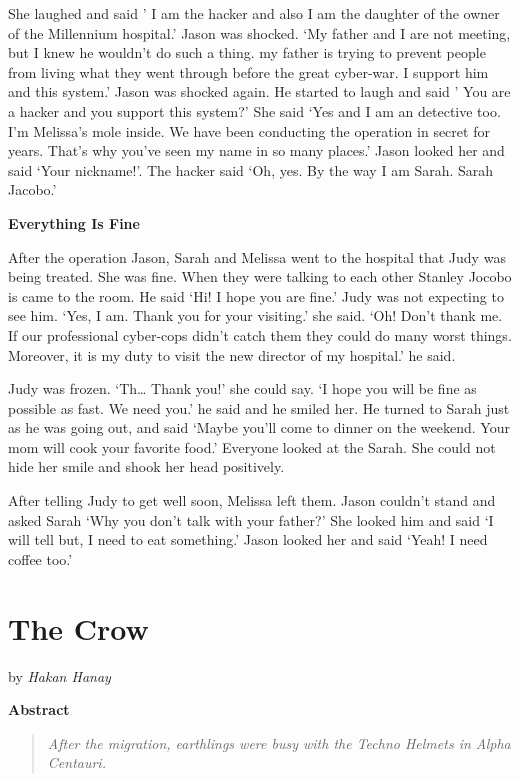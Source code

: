 \documentclass[]{book}
\begin{document}
She laughed and said ' I am the hacker and also I am the daughter of the owner of the Millennium hospital.' Jason was shocked. `My father and I are not meeting, but I knew he wouldn't do such a thing. my father is trying to prevent people from living what they went through before the great cyber-war. I support him and this system.' Jason was shocked again. He started to laugh and said ' You are a hacker and you support this system?' She said `Yes and I am an detective too. I'm Melissa's mole inside. We have been conducting the operation in secret for years. That's why you've seen my name in so many places.' Jason looked her and said `Your nickname!'. The hacker said `Oh, yes. By the way I am Sarah. Sarah Jacobo.'

\textbf{Everything Is Fine}

After the operation Jason, Sarah and Melissa went to the hospital that Judy was being treated. She was fine. When they were talking to each other Stanley Jocobo is came to the room. He said `Hi! I hope you are fine.' Judy was not expecting to see him. `Yes, I am. Thank you for your visiting.' she said. `Oh! Don't thank me. If our professional cyber-cops didn't catch them they could do many worst things. Moreover, it is my duty to visit the new director of my hospital.' he said.

Judy was frozen. `Th\ldots{} Thank you!' she could say. `I hope you will be fine as possible as fast. We need you.' he said and he smiled her. He turned to Sarah just as he was going out, and said `Maybe you'll come to dinner on the weekend. Your mom will cook your favorite food.' Everyone looked at the Sarah. She could not hide her smile and shook her head positively.

After telling Judy to get well soon, Melissa left them. Jason couldn't stand and asked Sarah `Why you don't talk with your father?' She looked him and said `I will tell but, I need to eat something.' Jason looked her and said `Yeah! I need coffee too.'

\hypertarget{the-crow}{%
\chapter{The Crow}\label{the-crow}}

by \emph{Hakan Hanay}

\textbf{Abstract}

\begin{quote}
\emph{After the migration, earthlings were busy with the Techno Helmets in Alpha Centauri.}
\end{quote}
\end{document}

